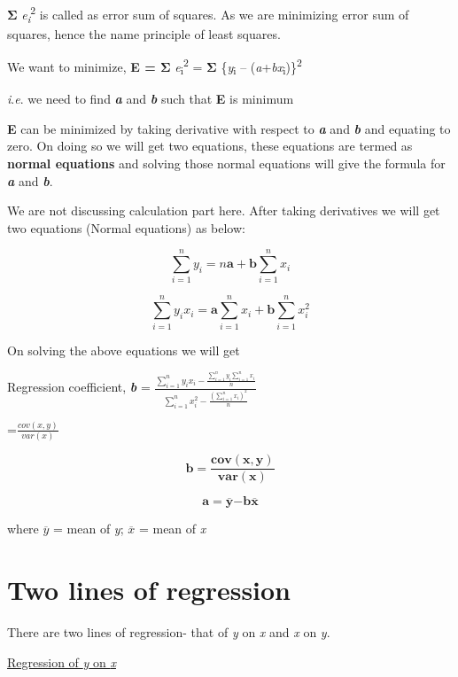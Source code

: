 \documentclass[
]{book}
\begin{document}
\textbf{Σ} \emph{e\textsubscript{i}}\textsuperscript{2} is called as error sum of squares. As we are minimizing
error sum of squares, hence the name principle of least squares.

We want to minimize, \textbf{E = Σ} \emph{e}\textsubscript{i}\textsuperscript{2} = \textbf{Σ} \{\emph{y}\textsubscript{i} --
(\emph{a}+\emph{bx}\textsubscript{i})\}\textsuperscript{2}

\emph{i}.\emph{e}. we need to find \textbf{\emph{a}} and \textbf{\emph{b}} such that \textbf{E} is minimum

\textbf{E} can be minimized by taking derivative with respect to \textbf{\emph{a}} and
\textbf{\emph{b}} and equating to zero. On doing so we will get two equations,
these equations are termed as \textbf{normal equations} and solving those
normal equations will give the formula for \textbf{\emph{a}} and \textbf{\emph{b}}.

We are not discussing calculation part here. After taking derivatives we
will get two equations (Normal equations) as below:

\[\sum_{i = 1}^{n}{y_{i} = n\mathbf{a} + \mathbf{b}\sum_{i = 1}^{n}x_{i}}\]

\[\sum_{i = 1}^{n}{y_{i}x_{i} = \mathbf{a}\sum_{i = 1}^{n}x_{i} + \mathbf{b}\sum_{i = 1}^{n}x_{i}^{2}}\]

On solving the above equations we will get

Regression coefficient, \textbf{\emph{b}} =
\(\frac{\sum_{i = 1}^{n}{y_{i}x_{i} - \frac{\sum_{i = 1}^{n}{y_{i}\sum_{i = 1}^{n}x_{i}}}{n}}}{\sum_{i = 1}^{n}x_{i}^{2} - \frac{\left( \sum_{i = 1}^{n}x_{i} \right)^{2}}{n}}\)

=\(\frac{cov(x,y)}{var(x)}\)

\[\mathbf{b =}\frac{\mathbf{cov(x,y)}}{\mathbf{var(x)}}
\]

\[\mathbf{a =}\overline{\mathbf{y}}\mathbf{- b}\overline{\mathbf{x}}\]

where \(\overline{y}\) = mean of \emph{y}; \(\overline{x}\) = mean of \emph{x}

\hypertarget{two-lines-of-regression}{%
\section{Two lines of regression}\label{two-lines-of-regression}}

There are two lines of regression- that of \emph{y} on \emph{x} and \emph{x} on \emph{y}.

\underline{Regression of \emph{y} on \emph{x}}
\end{document}
